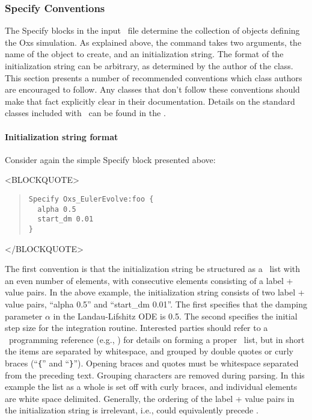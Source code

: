\subsubsection{Specify Conventions}%
\label{sec:specConventions}
The Specify blocks in the input \MIF\ file determine the collection
of  objects defining the Oxs simulation.  As explained
above, the  command takes two
arguments, the name of the  object to create, and an
initialization string.  The format of the initialization string can
be arbitrary, as determined by the author of the  class.
This section presents a number of recommended conventions which
 class authors are encouraged to follow.  Any 
classes that don't follow these conventions should make that fact
explicitly clear in their documentation.
Details on the standard  classes included with \OOMMF\ can
be found in the
.

\paragraph{Initialization string format}%
\label{par:specInitString}
Consider again the simple Specify block presented above:
\begin{rawhtml}<BLOCKQUOTE>\end{rawhtml}
\begin{quote}
\begin{verbatim}
Specify Oxs_EulerEvolve:foo {
  alpha 0.5
  start_dm 0.01
}
\end{verbatim}
\end{quote}
\begin{rawhtml}</BLOCKQUOTE>\end{rawhtml}
The first convention is that the initialization string be structured as
a \Tcl\ list with an even number of elements, with
consecutive elements consisting of a label + value pairs.  In the above
example, the initialization string consists of two label + value pairs,
``alpha 0.5'' and ``start\_dm 0.01''.  The first specifies that the
damping parameter $\alpha$ in the Landau-Lifshitz ODE is 0.5.  The
second specifies the initial step size for the integration routine.
Interested parties should refer to a \Tcl\ programming reference (e.g.,
\cite{welch00}) for details on forming a proper \Tcl\ list, but in short
the items are separated by whitespace, and grouped by double quotes or
curly braces (``\verb+{+'' and ``\verb+}+'').  Opening braces and quotes
must be whitespace separated from the preceding text.  Grouping
characters are removed during parsing.  In this example the list as a
whole is set off with curly braces, and individual elements are white
space delimited.  Generally, the ordering of the label + value pairs in
the initialization string is irrelevant, i.e.,  could
equivalently precede .


